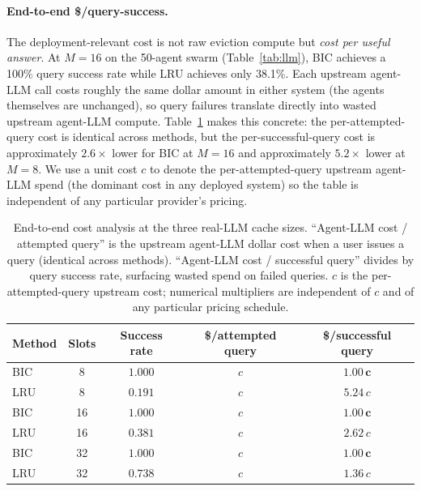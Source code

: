 \documentclass[fleqn,10pt]{article}
\theoremstyle{definition}
\newcommand{\slots}{M}
\begin{document}
\paragraph{End-to-end \$/query-success.}
The deployment-relevant cost is not raw eviction compute but
\emph{cost per useful answer}. At $\slots{=}16$ on the 50-agent
swarm (Table~\ref{tab:llm}), BIC achieves a 100\% query success rate
while LRU achieves only 38.1\%. Each upstream agent-LLM call costs
roughly the same dollar amount in either system (the agents
themselves are unchanged), so query failures translate directly into
wasted upstream agent-LLM compute. Table~\ref{tab:cost_analysis}
makes this concrete: the per-attempted-query cost is identical
across methods, but the per-successful-query cost is approximately
$2.6\times$ lower for BIC at $\slots{=}16$ and approximately
$5.2\times$ lower at $\slots{=}8$. We use a unit cost $c$ to
denote the per-attempted-query upstream agent-LLM spend (the
dominant cost in any deployed system) so the table is independent
of any particular provider's pricing.

\begin{table}[t]
\centering
\caption{End-to-end cost analysis at the three real-LLM cache
sizes. ``Agent-LLM cost / attempted query'' is the upstream
agent-LLM dollar cost when a user issues a query (identical across
methods). ``Agent-LLM cost / successful query'' divides by query
success rate, surfacing wasted spend on failed queries.
$c$ is the per-attempted-query upstream cost; numerical multipliers
are independent of $c$ and of any particular pricing schedule.
\label{tab:cost_analysis}}
\begin{tabular}{lcccc}
\toprule
\textbf{Method} & \textbf{Slots} & \textbf{Success rate} &
\textbf{\$/attempted query} & \textbf{\$/successful query} \\
\midrule
BIC         & 8  & $\mathbf{1.000}$ & $c$ & $\mathbf{1.00\,c}$ \\
LRU         & 8  & $0.191$          & $c$ & $5.24\,c$ \\
BIC         & 16 & $\mathbf{1.000}$ & $c$ & $\mathbf{1.00\,c}$ \\
LRU         & 16 & $0.381$          & $c$ & $2.62\,c$ \\
BIC         & 32 & $\mathbf{1.000}$ & $c$ & $\mathbf{1.00\,c}$ \\
LRU         & 32 & $0.738$          & $c$ & $1.36\,c$ \\
\bottomrule
\end{tabular}
\end{table}
\end{document}
